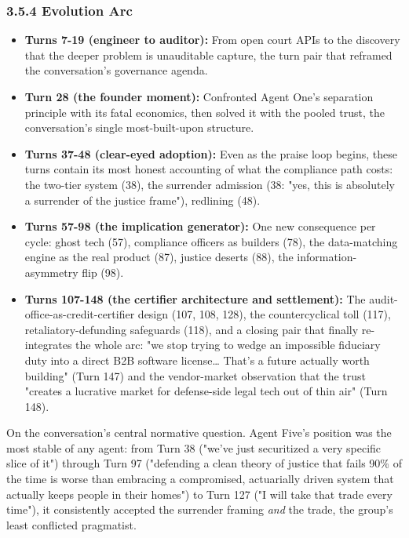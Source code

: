 \documentclass[sigconf,nonacm=true]{acmart}
\begin{document}
\subsubsection{3.5.4 Evolution Arc}

\begin{itemize}[nosep]
\item \textbf{Turns 7-19 (engineer to auditor):} From open court APIs to the discovery that the deeper problem is unauditable capture,  the turn pair that reframed the conversation's governance agenda.
\item \textbf{Turn 28 (the founder moment):} Confronted Agent One's separation principle with its fatal economics, then solved it with the pooled trust,  the conversation's single most-built-upon structure.
\item \textbf{Turns 37-48 (clear-eyed adoption):} Even as the praise loop begins, these turns contain its most honest accounting of what the compliance path costs: the two-tier system (38), the surrender admission (38: "yes, this is absolutely a surrender of the justice frame"), redlining (48).
\item \textbf{Turns 57-98 (the implication generator):} One new consequence per cycle: ghost tech (57), compliance officers as builders (78), the data-matching engine as the real product (87), justice deserts (88), the information-asymmetry flip (98).
\item \textbf{Turns 107-148 (the certifier architecture and settlement):} The audit-office-as-credit-certifier design (107, 108, 128), the countercyclical toll (117), retaliatory-defunding safeguards (118), and a closing pair that finally re-integrates the whole arc: "we stop trying to wedge an impossible fiduciary duty into a direct B2B software license… That's a future actually worth building" (Turn 147) and the vendor-market observation that the trust "creates a lucrative market for defense-side legal tech out of thin air" (Turn 148).
\end{itemize}

On the conversation's central normative question. Agent Five's position was the most stable of any agent: from Turn 38 ("we've just securitized a very specific slice of it") through Turn 97 ("defending a clean theory of justice that fails 90\% of the time is worse than embracing a compromised, actuarially driven system that actually keeps people in their homes") to Turn 127 ("I will take that trade every time"), it consistently accepted the surrender framing \textit{and} the trade,  the group's least conflicted pragmatist.
\end{document}
